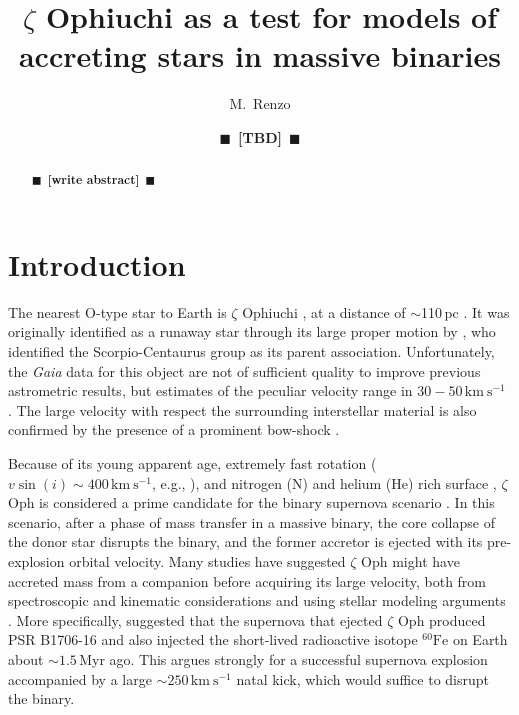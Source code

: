 \documentclass[twocolumn,twocolappendix,trackchanges]{aastex63}
\newcommand{\todo}[1]{{\large $\blacksquare$~\textbf{\color{red}[#1]}}~$\blacksquare$}
\begin{document}
\title{$\zeta$ Ophiuchi as a test for models of accreting stars in
  massive binaries}
\author[0000-0002-6718-9472]{M.~Renzo}

\author{\todo{TBD}}

\begin{abstract}
\todo{write abstract}
\end{abstract}

\vspace*{-10pt}


\section{Introduction}
\label{sec:intro}


The nearest O-type star to Earth is $\zeta$ Ophiuchi \citep[spectral
type O9.5{\rm IVnn},][]{sota:14}, at %
a distance of $\sim$110\,pc \citep[e.g.,][and references
therein]{neuhauser:20}. It was originally identified as a runaway star
through its large proper motion by \cite{blaauw:52}, who identified
the Scorpio-Centaurus group as its parent association.  Unfortunately,
the \emph{Gaia} data for this object are not of sufficient quality to
improve previous astrometric results, but estimates of the peculiar
velocity range in $30-50\,\mathrm{km \ s^{-1}}$
\citep[e.g.,][]{zehe:18, neuhauser:20}. The
large velocity with respect the surrounding interstellar material is
also confirmed by the presence of a prominent bow-shock
\citep[e.g.,][]{bodensteiner:18}.

Because of its young apparent age, extremely fast rotation
($v\sin(i)\sim 400\,\mathrm{km\ s^{-1}}$, e.g., \citealt{zehe:18}),
and nitrogen (N) and helium (He) rich surface \citep[e.g.,][]{blaauw:93,
  villamariz:05, marcolino:09}, $\zeta$ Oph is considered a prime
candidate for the binary supernova scenario \citep{blaauw:61,
  renzo:19walk}. In this scenario, after a phase of mass transfer in a
massive binary, the core collapse of the donor star disrupts the
binary, and the former accretor is ejected with its pre-explosion
orbital velocity. Many studies have suggested $\zeta$ Oph
might have accreted mass from a companion before acquiring its large
velocity, both from spectroscopic and kinematic considerations
\citep[e.g.,][]{blaauw:93, hoogerwerf:00, hoogerwerf:01, tetzlaff:10, neuhauser:20}
and using stellar modeling arguments
\citep[e.g.,][]{vanrensbergen:96}.  More specifically,
\cite{neuhauser:20} suggested that the supernova that ejected $\zeta$
Oph produced PSR B1706-16 and also injected the short-lived
radioactive isotope $^{60}\mathrm{Fe}$ on Earth about $\sim 1.5$\,Myr
ago. This argues strongly for a successful supernova explosion
accompanied by a large $\sim 250\,\mathrm{km\ s^{-1}}$ natal kick,
which would suffice to disrupt the binary.
\end{document}
